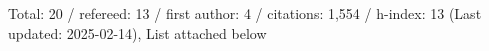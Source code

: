 Total: 20 / refereed: 13 / first author: 4 / citations: 1,554 / h-index: 13 (Last updated: 2025-02-14), List attached below